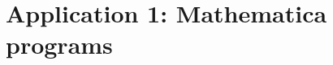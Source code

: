 \documentclass[12pt,letterpaper,oneside,reqno]{amsart}
\begin{document}
    
    


    \clearpage
    \section*{Application 1: Mathematica programs}
    


%    
%
%
%    
\end{document}
